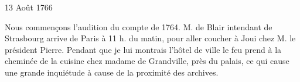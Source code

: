                      \begin{diary}{13 Août 1766}{}

                         Nous commençons l'audition du compte
                           de
                           1764. M. de Blair intendant de Strasbourg
                           arrive de Paris à 11 h. du
                           matin, pour aller
                           coucher à Joui
                           chez
                           M. le président Pierre.
                           Pendant que je lui montrais l'hôtel de
                              ville
                           le feu prend à la cheminée de la cuisine
                           chez
                           madame de Grandville, près du palais,
                           ce qui cause une grande inquiétude à
                           cause de la proximité des archives. \bigskip


                     \end{diary}

